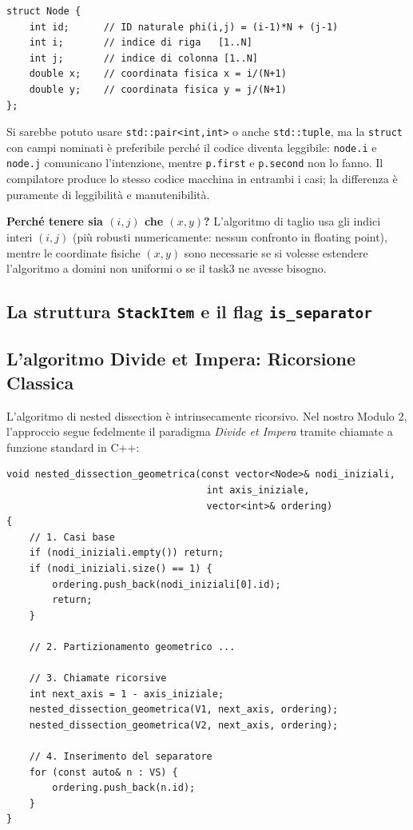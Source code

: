 \documentclass[a4paper,11pt]{article}
\theoremstyle{definition}
\begin{document}
\begin{lstlisting}[style=cpp, caption={Struttura Node con campi nominati}]
struct Node {
    int id;      // ID naturale phi(i,j) = (i-1)*N + (j-1)
    int i;       // indice di riga   [1..N]
    int j;       // indice di colonna [1..N]
    double x;    // coordinata fisica x = i/(N+1)
    double y;    // coordinata fisica y = j/(N+1)
};
\end{lstlisting}

Si sarebbe potuto usare \texttt{std::pair<int,int>} o anche \texttt{std::tuple}, ma la \texttt{struct} con campi nominati è preferibile perché il codice diventa leggibile: \texttt{node.i} e \texttt{node.j} comunicano l'intenzione, mentre \texttt{p.first} e \texttt{p.second} non lo fanno. Il compilatore produce lo stesso codice macchina in entrambi i casi; la differenza è puramente di leggibilità e manutenibilità.

\textbf{Perché tenere sia $(i,j)$ che $(x,y)$?} L'algoritmo di taglio usa gli indici interi $(i,j)$ (più robusti numericamente: nessun confronto in floating point), mentre le coordinate fisiche $(x,y)$ sono necessarie se si volesse estendere l'algoritmo a domini non uniformi o se il task3 ne avesse bisogno.

\subsection{La struttura \texttt{StackItem} e il flag \texttt{is\_separator}}

\subsection{L'algoritmo Divide et Impera: Ricorsione Classica}

L'algoritmo di nested dissection è intrinsecamente ricorsivo. Nel nostro Modulo 2, l'approccio segue fedelmente il paradigma \textit{Divide et Impera} tramite chiamate a funzione standard in C++:

\begin{lstlisting}[style=cpp, caption={Struttura della ricorsione}]
void nested_dissection_geometrica(const vector<Node>& nodi_iniziali,
                                   int axis_iniziale,
                                   vector<int>& ordering)
{
    // 1. Casi base
    if (nodi_iniziali.empty()) return;
    if (nodi_iniziali.size() == 1) {
        ordering.push_back(nodi_iniziali[0].id);
        return;
    }

    // 2. Partizionamento geometrico ...
    
    // 3. Chiamate ricorsive
    int next_axis = 1 - axis_iniziale;
    nested_dissection_geometrica(V1, next_axis, ordering);
    nested_dissection_geometrica(V2, next_axis, ordering);

    // 4. Inserimento del separatore
    for (const auto& n : VS) {
        ordering.push_back(n.id);
    }
}
\end{lstlisting}
\end{document}
